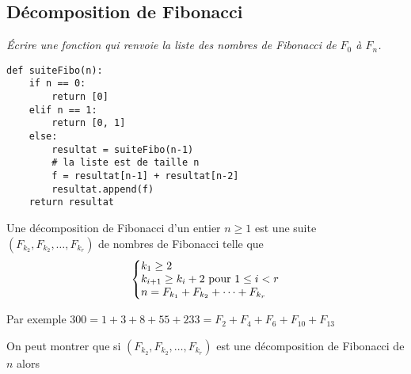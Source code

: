 \subsection{Décomposition de Fibonacci}
\begin{Exercise}[title = {Suite}]\it
Écrire une fonction  qui renvoie la liste des nombres de Fibonacci de $F_0$ à $F_n$.
\end{Exercise}
\begin{Answer}
\begin{lstlisting}
def suiteFibo(n):
    if n == 0:
        return [0]
    elif n == 1:
        return [0, 1]
    else:
        resultat = suiteFibo(n-1)
        # la liste est de taille n
        f = resultat[n-1] + resultat[n-2]
        resultat.append(f)
    return resultat
\end{lstlisting}
\end{Answer}

\medskip

Une décomposition de Fibonacci d'un entier $n\ge 1$ est une suite $(F_{k_2}, F_{k_2}, \ldots, F_{k_r})$ de nombres de Fibonacci telle que
\[\left\{\begin{matrix} 
k_1 \ge 2\hfill\\
k_{i+1} \ge k_i +2 \hbox{ pour } 1\le i < r\\
n = F_{k_1} +F_{k_2} + \cdots +F_{k_r} \hfill\\
\end{matrix}\right.\]

Par exemple $300 = 1 + 3 + 8 + 55 + 233 = F_2 + F_4 + F_6 + F_{10} + F_{13}$

\medskip

On peut montrer que si $(F_{k_2}, F_{k_2}, \ldots, F_{k_r})$ est une décomposition de Fibonacci de $n$ alors 

